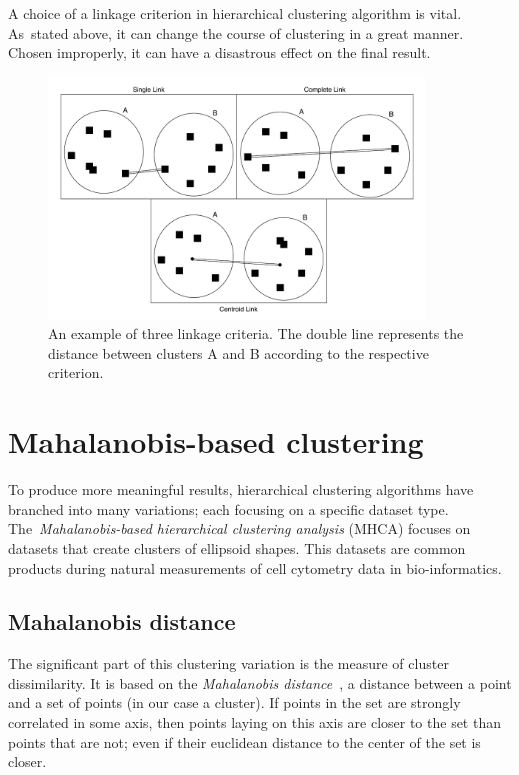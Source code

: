 A choice of a linkage criterion in hierarchical clustering algorithm is vital. As~stated above, it can change the course of clustering in a great manner. Chosen improperly, it can have a disastrous effect on the final result.

\begin{figure}\centering
	\includegraphics[width=10cm]{img/linkage_criteria}
	\caption{An example of three linkage criteria. The double line represents the distance between clusters A and B according to the respective criterion.}
	\label{fig01:link}
\end{figure}

\section{Mahalanobis-based clustering}

To produce more meaningful results, hierarchical clustering algorithms have branched into many variations; each focusing on a specific dataset type. The~\emph{Ma\-ha\-la\-no\-bis-based hierarchical clustering analysis} (MHCA) focuses on datasets that create clusters of ellipsoid shapes. This datasets are common products during natural measurements of cell cytometry data in bio-informatics.

\subsection{Mahalanobis distance}

The significant part of this clustering variation is the measure of cluster dissimilarity. It is based on the \emph{Mahalanobis distance}~\cite{mahalanobis1936generalized}, a distance between a point and a set of points (in our case a cluster). If points in the set are strongly correlated in some axis, then points laying on this axis are closer to the set than points that are not; even if their euclidean distance to the center of the set is closer.

